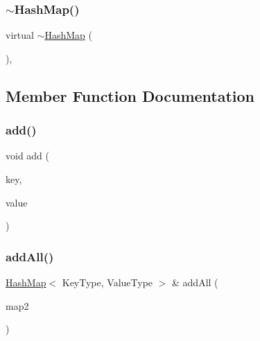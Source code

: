 \mbox{\label{classHashMap_a80714b3ce58e1138cd23b2dd4e14337e}} 
\subsubsection{\texorpdfstring{$\sim$\+Hash\+Map()}{~HashMap()}}
{\footnotesize\ttfamily virtual $\sim$\mbox{\hyperlink{classHashMap}{Hash\+Map}} (\begin{DoxyParamCaption}{ }\end{DoxyParamCaption})\hspace{0.3cm}{\ttfamily [virtual]}, {\ttfamily [default]}}



\subsection{Member Function Documentation}
\mbox{\label{classHashMap_a9129d6095063e7e14d85c627d35086a5}} 
\subsubsection{\texorpdfstring{add()}{add()}}
{\footnotesize\ttfamily void add (\begin{DoxyParamCaption}\item[{const Key\+Type \&}]{key,  }\item[{const Value\+Type \&}]{value }\end{DoxyParamCaption})}

\mbox{\label{classHashMap_acda70726afb75a7250066bb06aff7ef9}} 
\subsubsection{\texorpdfstring{add\+All()}{addAll()}}
{\footnotesize\ttfamily \mbox{\hyperlink{classHashMap}{Hash\+Map}}$<$ Key\+Type, Value\+Type $>$ \& add\+All (\begin{DoxyParamCaption}\item[{const \mbox{\hyperlink{classHashMap}{Hash\+Map}}$<$ Key\+Type, Value\+Type $>$ \&}]{map2 }\end{DoxyParamCaption})}

